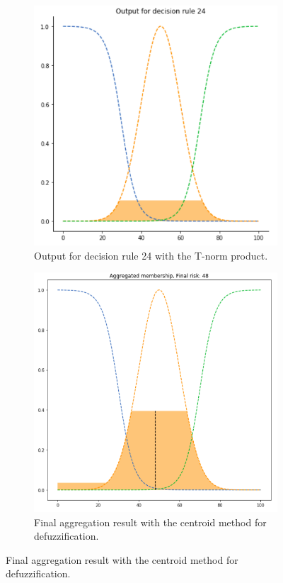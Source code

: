 \documentclass[conference]{IEEEtran}
\begin{document}
\begin{figure}[ht]
\begin{subfigure}{.5\textwidth}
  \centering
  \includegraphics[width=.8\linewidth]{figures/third/prod3.png}  
  \caption{Output for decision rule 24 with the T-norm product.}
  \label{fig:3prod3}
\end{subfigure}
\begin{subfigure}{.5\textwidth}
  \centering
  \includegraphics[width=.8\linewidth]{figures/third/prod-centroid.png}  
  \caption{Final aggregation result with the centroid method for defuzzification.}
  \label{fig:3prod-centroid}
\end{subfigure}

\end{figure}
\end{document}
